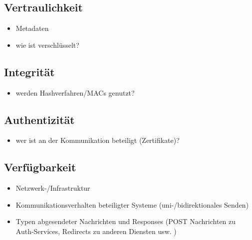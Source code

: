 \subsection*{Vertraulichkeit}
\begin{itemize}
    \item Metadaten
    \item wie ist verschlüsselt?
\end{itemize}

\subsection*{Integrität}
\begin{itemize}
    \item werden Hashverfahren/MACs genutzt?
\end{itemize}

\subsection*{Authentizität}
\begin{itemize}
    \item wer ist an der Kommunikation beteiligt (Zertifikate)?
\end{itemize}

\subsection*{Verfügbarkeit}
\begin{itemize}
    \item Netzwerk-/Infrastruktur
    \item Kommunikationsverhalten beteiligter Systeme (uni-/bidirektionales Senden)
    \item Typen abgesendeter Nachrichten und Responses (POST Nachrichten zu Auth-Services, Redirects zu anderen Diensten usw. )
\end{itemize}


